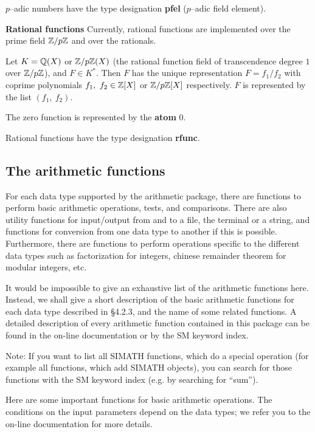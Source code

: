 $p$\/--adic numbers have the type designation {\bf pfel} ($p$\/--adic field element).

\newpage
\leer
{\bf Rational functions}
\leer  
Currently, rational functions are implemented over the prime field $\mbox{$\mathbb Z$}/p\mbox{$\mathbb Z$}$
and over the rationals.

Let $K = \mbox{$\mathbb Q$}(X)$ or $\mbox{$\mathbb Z$}/p\mbox{$\mathbb Z$}(X)$ (the rational function field of transcendence degree $1$ over
$\mbox{$\mathbb Z$}/p\mbox{$\mathbb Z$}$), and $F \in K^*$. Then $F$ has the unique representation $F = f_1/f_2$ with coprime
polynomials $f_1,\  f_2 \in \mbox{$\mathbb Z$}[X]$ or $\mbox{$\mathbb Z$}/p\mbox{$\mathbb Z$}[X]$ respectively. $F$ is represented by the list
$(f_1,\ f_2)$.

The zero function is represented by the {\bf atom} $0$.

Rational functions have the type designation {\bf rfunc}.

\subsection{The arithmetic functions}
For each data type supported by the arithmetic package, there are functions to perform
basic arithmetic operations, tests, and comparisons. There are also utility functions for 
input/output from and to a file, the terminal or a string, and functions for
conversion from one data type to another if this is possible. Furthermore, there are
functions to perform operations specific to the different data types such as
factorization for integers, chinese remainder theorem for modular integers, etc.

It would be impossible to give an exhaustive list of the arithmetic functions here.
Instead, we shall give a short description of the basic arithmetic functions for each data
type described in \S 4.2.3, and the name of some related functions. A detailed
description of every arithmetic function contained in this package can be found
in the on-line documentation or by the SM keyword index. 

Note: If you want to list all SIMATH functions, which do a special operation
(for example all functions, which add SIMATH objects), you can search for
those functions with the SM keyword index (e.g. by searching for ``sum'').

\newpage

Here are some important functions for basic arithmetic operations. The conditions
on the input parameters depend on the data types; we refer you to the on-line documentation
for more details.

